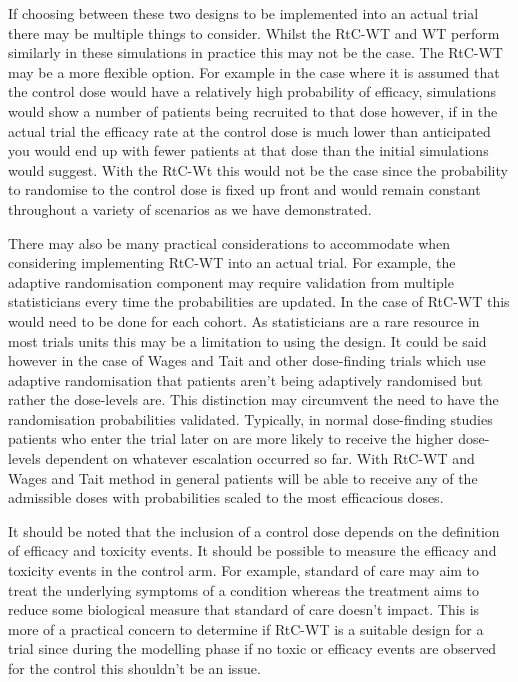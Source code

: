 If choosing between these two designs to be implemented into an actual trial there may be multiple things to consider. Whilst the RtC-WT and WT perform similarly in these simulations in practice this may not be the case. The RtC-WT may be a more flexible option. For example in the case where it is assumed that the control dose would have a relatively high probability of efficacy, simulations would show a number of patients being recruited to that dose however, if in the actual trial the efficacy rate at the control dose is much lower than anticipated you would end up with fewer patients at that dose than the initial simulations would suggest. With the RtC-Wt this would not be the case since the probability to randomise to the control dose is fixed up front and would remain constant throughout a variety of scenarios as we have demonstrated.

There may also be many practical considerations to accommodate when considering implementing RtC-WT into an actual trial. For example, the adaptive randomisation component may require validation from multiple statisticians every time the probabilities are updated. In the case of RtC-WT this would need to be done for each cohort. As statisticians are a rare resource in most trials units this may be a limitation to using the design. It could be said however in the case of Wages and Tait and other dose-finding trials which use adaptive randomisation that patients aren't being adaptively randomised but rather the dose-levels are. This distinction may circumvent the need to have the randomisation probabilities validated. Typically, in normal dose-finding studies patients who enter the trial later on are more likely to receive the higher dose-levels dependent on whatever escalation occurred so far. With RtC-WT and Wages and Tait method in general patients will be able to receive any of the admissible doses with probabilities scaled to the most efficacious doses. 

It should be noted that the inclusion of a control dose depends on the definition of efficacy and toxicity events. It should be possible to measure the efficacy and toxicity events in the control arm. For example, standard of care may aim to treat the underlying symptoms of a condition whereas the treatment aims to reduce some biological measure that standard of care doesn't impact. This is more of a practical concern to determine if RtC-WT is a suitable design for a trial since during the modelling phase if no toxic or efficacy events are observed for the control this shouldn't be an issue. 

